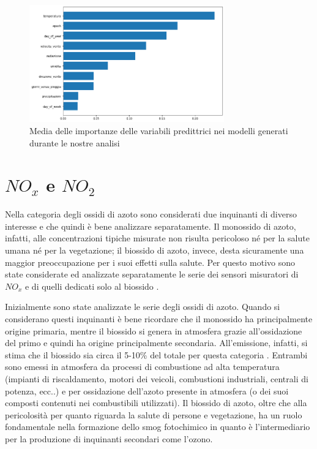 \begin{figure}[h]
\centering
\includegraphics[width=0.75\textwidth]{intro_importanza_totale}
\caption{Media delle importanze delle variabili predittrici nei modelli generati durante le nostre analisi}
\label{fig:importanza_tot}
\end{figure}

\section{$NO_x$ e $NO_2$}
Nella categoria degli ossidi di azoto sono considerati due inquinanti di diverso interesse e che quindi è bene analizzare separatamente. Il monossido di azoto, infatti, alle concentrazioni tipiche misurate non risulta pericoloso né per la salute umana né per la vegetazione; il biossido di azoto, invece, desta sicuramente una maggior preoccupazione per i suoi effetti sulla salute. Per questo motivo sono state considerate ed analizzate separatamente le serie dei sensori misuratori di $NO_x$ e di quelli dedicati solo al biossido \cite{world2006air}.

Inizialmente sono state analizzate le serie degli ossidi di azoto. Quando si considerano questi inquinanti è bene ricordare che il monossido ha principalmente origine primaria, mentre il biossido si genera in atmosfera grazie all'ossidazione del primo e quindi ha origine principalmente secondaria. All'emissione, infatti, si stima che il biossido sia circa il 5-10\% del totale per questa categoria \cite{arpa2018rapporto}.  
Entrambi sono emessi in atmosfera da processi di combustione ad alta temperatura (impianti di riscaldamento, motori dei veicoli, combustioni industriali, centrali di potenza, ecc..) e per ossidazione dell'azoto presente in atmosfera (o dei suoi composti contenuti nei combustibili utilizzati). Il biossido di azoto, oltre che alla pericolosità per quanto riguarda la salute di persone e vegetazione, ha un ruolo fondamentale nella formazione dello smog fotochimico in quanto è l'intermediario per la produzione di inquinanti secondari come l'ozono.

